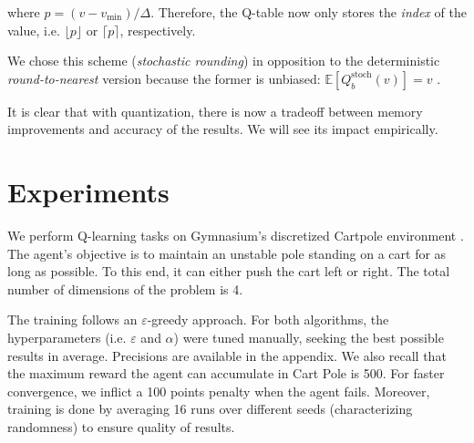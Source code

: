 \documentclass[10pt,conference,compsocconf]{IEEEtran}
\begin{document}
        where $p = (v - v_{\min}) / \Delta$. Therefore, the Q-table now only stores the \textit{index} of the value, i.e. $\lfloor p \rfloor$ or $\lceil p \rceil$, respectively.
        
        We chose this scheme (\textit{stochastic rounding}) in opposition to the deterministic \textit{round-to-nearest} version because the former is unbiased: $\mathbb{E}[Q_b^{\text{stoch}}(v)]
        = v$ \cite{gupta2015}.
        
        It is clear that with quantization, there is now a tradeoff between memory improvements and accuracy of the results. We will see its impact empirically.

        
        


        \section{Experiments}

        We perform Q-learning tasks on Gymnasium's discretized Cartpole environment \cite{towers2025gymnasiumstandardinterfacereinforcement}. The agent's objective is to maintain an unstable pole standing on a cart for as long as possible. To this end, it can either push the cart left or right. The total number of dimensions of the problem is 4.
        
        The training follows an $\varepsilon$-greedy approach. For both algorithms, the hyperparameters (i.e. $\varepsilon$ and $\alpha$) were tuned manually, seeking the best possible results in average. Precisions are available in the appendix. We also recall that the maximum reward the agent can accumulate in Cart Pole is 500. For faster convergence, we inflict a 100 points penalty when the agent fails. Moreover, training is done by averaging 16 runs over different seeds (characterizing randomness) to ensure quality of results.
\end{document}

